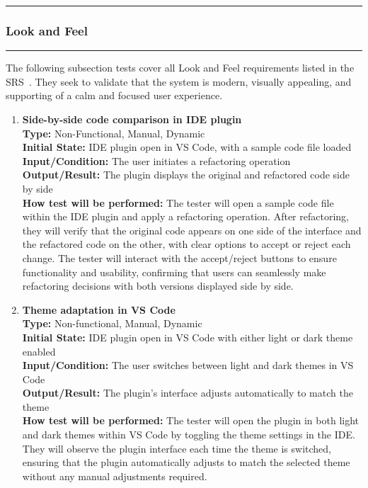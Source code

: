 \documentclass[12pt, titlepage]{article}
\newcommand{\colorrule}{\textcolor{BlueViolet}{\rule{\linewidth}{2pt}}}
\begin{document}
\noindent
\colorrule

\subsubsection{Look and Feel}

\colorrule

\medskip

\noindent
The following subsection tests cover all Look and Feel requirements listed in the SRS~\cite{SRS}. They seek to validate that the system is modern, visually appealing, and supporting of a calm and focused user experience. 
		
\begin{enumerate}[label={\bf \textcolor{Maroon}{test-LF-\arabic*}}, wide=0pt, font=\itshape]
  \item \textbf{Side-by-side code comparison in IDE plugin} \\[2mm]
    \textbf{Type:} Non-Functional, Manual, Dynamic \\
    \textbf{Initial State:} IDE plugin open in VS Code, with a sample code file loaded \\
    \textbf{Input/Condition:} The user initiates a refactoring operation \\
    \textbf{Output/Result:} The plugin displays the original and refactored code side by side\\[2mm]
    \textbf{How test will be performed:} The tester will open a sample code file within the IDE plugin and apply a refactoring operation. After refactoring, they will verify that the original code appears on one side of the interface and the refactored code on the other, with clear options to accept or reject each change. The tester will interact with the accept/reject buttons to ensure functionality and usability, confirming that users can seamlessly make refactoring decisions with both versions displayed side by side.

  \item \textbf{Theme adaptation in VS Code} \\[2mm]
    \textbf{Type:} Non-functional, Manual, Dynamic \\
    \textbf{Initial State:} IDE plugin open in VS Code with either light or dark theme enabled \\
    \textbf{Input/Condition:} The user switches between light and dark themes in VS Code \\
    \textbf{Output/Result:} The plugin’s interface adjusts automatically to match the theme \\[2mm]
    \textbf{How test will be performed:} The tester will open the plugin in both light and dark themes within VS Code by toggling the theme settings in the IDE. They will observe the plugin interface each time the theme is switched, ensuring that the plugin automatically adjusts to match the selected theme without any manual adjustments required. 


\end{enumerate}
\end{document}
